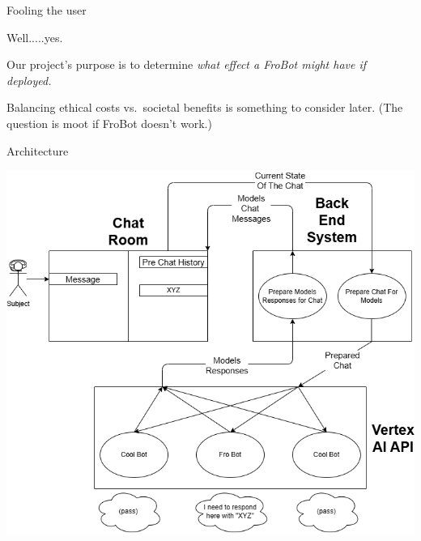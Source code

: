 \documentclass[12pt]{beamer}
\begin{document}
\begin{frame}[c]{Fooling the user}
\pause

Well.....yes.

\pause

Our project's purpose is to determine \textit{what effect a FroBot might have if deployed.}

Balancing ethical costs vs.~societal benefits is something to consider later. (The question is moot if FroBot doesn't work.)

\end{frame}
\begin{frame}[c]{Architecture}
\begin{center}
\includegraphics[width=.65\linewidth]{Experiment Design.drawio.png}
\end{center}
\end{frame}
\end{document}
